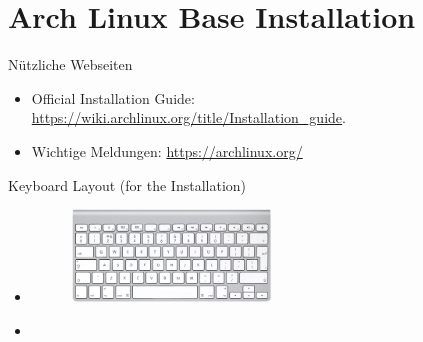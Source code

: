 
\section{Arch Linux Base Installation}

\begin{frame}[fragile]{Nützliche Webseiten}
  \begin{itemize}
    \item \alert{Official Installation Guide:} \url{https://wiki.archlinux.org/title/Installation_guide}.
    \item \alert{Wichtige Meldungen:} \url{https://archlinux.org/}
  \end{itemize}
\end{frame}

\begin{frame}[fragile]{Keyboard Layout (for the Installation)}
  \begin{itemize}
    \item {}
    \begin{figure}
      \includegraphics[width=0.5\textwidth]{./figures/keyboard.png}
    \end{figure}
    \item {}
  \end{itemize}
\end{frame}

